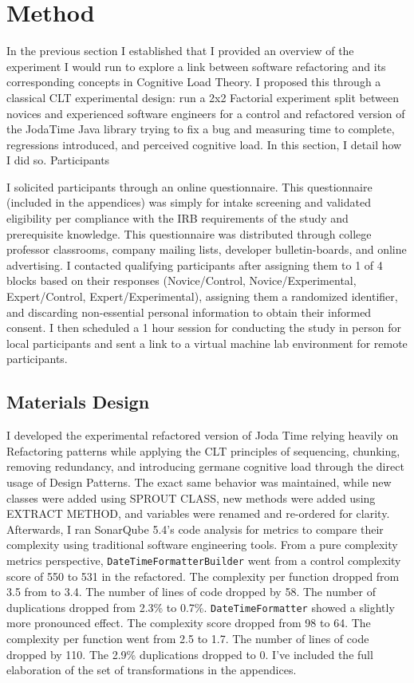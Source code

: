 \chapter{Method}

In the previous section I established that I provided an overview of the experiment I would run to explore a link between software refactoring and its corresponding concepts in Cognitive Load Theory. I proposed this through a classical CLT experimental design: run a 2x2 Factorial experiment split between novices and experienced software engineers for a control and refactored version of the JodaTime Java library trying to fix a bug and measuring time to complete, regressions introduced, and perceived cognitive load. In this section, I detail how I did so.
Participants


I solicited participants through an online questionnaire. This questionnaire (included in the appendices) was simply for intake screening and validated eligibility per compliance with the IRB requirements of the study and prerequisite knowledge. This questionnaire was distributed through college professor classrooms, company mailing lists, developer bulletin-boards, and online advertising. I contacted qualifying participants after assigning them to 1 of 4 blocks based on their responses (Novice/Control, Novice/Experimental, Expert/Control, Expert/Experimental), assigning them a randomized identifier, and discarding non-essential personal information to obtain their informed consent. I then scheduled a 1 hour session for conducting the study in person for local participants and sent a link to a virtual machine lab environment for remote participants.  

\section{Materials Design}


I developed the experimental refactored version of Joda Time relying heavily on Refactoring patterns while applying the CLT principles of sequencing, chunking, removing redundancy, and introducing germane cognitive load through the direct usage of Design Patterns. The exact same behavior was maintained, while new classes were added using SPROUT CLASS, new methods were added using EXTRACT METHOD, and variables were renamed and re-ordered for clarity. Afterwards, I ran SonarQube 5.4’s code analysis for metrics to compare their complexity using traditional software engineering tools. From a pure complexity metrics perspective, \texttt{DateTimeFormatterBuilder} went from a control complexity score of 550 to 531 in the refactored. The complexity per function dropped from 3.5 from to 3.4. The number of lines of code dropped by 58. The number of duplications dropped from 2.3\% to 0.7\%. \texttt{DateTimeFormatter} showed a slightly more pronounced effect. The complexity score dropped from 98 to 64. The complexity per function went from 2.5 to 1.7. The number of lines of code dropped by 110. The 2.9\% duplications dropped to 0. I’ve included the full elaboration of the set of transformations in the appendices.

